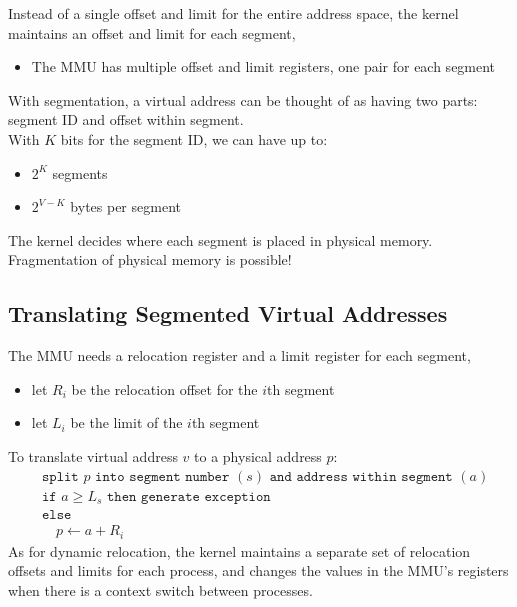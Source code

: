 \documentclass[12pt]{article}
\theoremstyle{plain}
\theoremstyle{definition}
\begin{document}
Instead of a single offset and limit for the entire address space, the kernel maintains an offset and limit for each segment,
\begin{itemize}
  \item The MMU has multiple offset and limit registers, one pair for each segment
\end{itemize}

With segmentation, a virtual address can be thought of as having two parts: segment ID and offset within segment. \\

With $K$ bits for the segment ID, we can have up to:
\begin{itemize}
  \item $2^{K}$ segments
  \item $2^{V - K}$ bytes per segment
\end{itemize}

The kernel decides where each segment is placed in physical memory.
Fragmentation of physical memory is possible!

\subsection{Translating Segmented Virtual Addresses}
The MMU needs a relocation register and a limit register for each segment,
\begin{itemize}
  \item let $R_{i}$ be the relocation offset for the $i$th segment
  \item let $L_{i}$ be the limit of the $i$th segment
\end{itemize}
To translate virtual address $v$ to a physical address $p$:
\begin{align*}
&\texttt{split } p \texttt{ into segment number }(s)\texttt{ and address within segment }(a) \\
&\texttt{if } a \geq L_{s} \texttt{ then generate exception} \\
&\texttt{else} \\
&\quad p \gets a + R_{i}
\end{align*}
As for dynamic relocation, the kernel maintains a separate set of relocation offsets and limits for each process, and changes the values in the MMU's registers when there is a context switch between processes.
\end{document}
